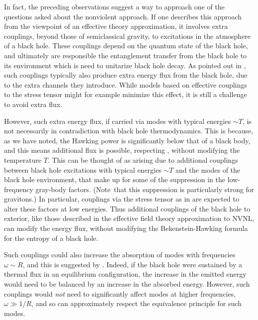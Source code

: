 In fact, the preceding observations suggest a way to approach one of the questions asked about the nonviolent approach.  If one describes this approach from the viewpoint of an effective theory approximation,  it involves extra couplings, beyond those of semiclassical gravity, to excitations in the atmosphere of a black hole.  These couplings depend on the quantum state of the black hole, and ultimately are responsible the entanglement transfer from the black hole to its environment which is need to unitarize black hole decay.  As pointed out in , such couplings typically also produce extra energy flux from the black hole, due to the extra channels they introduce.  While models based on effective couplings to the stress tensor might for example minimize this effect\NVNLT, it is still a challenge to avoid extra flux.  

However, such extra energy flux, if carried via modes with typical energies $\sim T$, is not necessarily in contradiction with black hole thermodynamics.  This is because, as we have noted, the Hawking power is significantly below that of a black body, and this means additional flux is  possible, respecting \SB, without modifying the temperature $T$.  This can be thought of as arising due to additional couplings between black hole excitations with typical energies $\sim T$ and the modes of the black hole environment, that make up for some of the suppression in the low-frequency gray-body factors.   (Note\Page\ that this suppression is particularly strong for gravitons.)  In particular, couplings via the stress tensor as in  are expected to alter these factors at low energies.
Thus additional couplings of the black hole to exterior,  like those described in the effective field theory approximation to NVNL,  can modify the energy flux, without modifying the Bekenstein-Hawking formula for the entropy of a black hole.

Such couplings could also increase the absorption of modes with frequencies $\omega\sim R$, and this is suggested by \pspec.  Indeed, if the black hole were sustained by a thermal flux in an equilibrium configuration, the increase in the emitted energy would need to be balanced by an increase in the absorbed energy.  However, such couplings would {\it not} need to significantly affect modes at higher frequencies, $\omega\gg1/R$, and so can approximately respect the equivalence principle for such modes.

